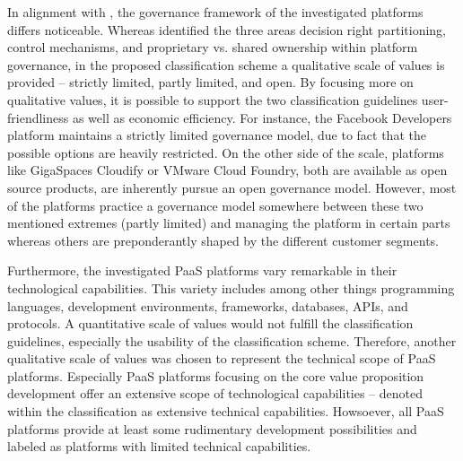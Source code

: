 In alignment with \citet{Tiwana2010}, the governance framework of the investigated platforms differs noticeable. Whereas \citet[pp. 679-681]{Tiwana2010} identified the three areas decision right partitioning, control mechanisms, and proprietary vs. shared ownership within platform governance, in the proposed classification scheme a qualitative scale of values is provided -- strictly limited, partly limited, and open. By focusing more on qualitative values, it is possible to support the two classification guidelines user-friendliness as well as economic efficiency. For instance, the Facebook Developers platform maintains a strictly limited governance model, due to fact that the possible options are heavily restricted. On the other side of the scale, platforms like GigaSpaces Cloudify or VMware Cloud Foundry, both are available as open source products, are inherently pursue an open governance model. However, most of the platforms practice a governance model somewhere between these two mentioned extremes (partly limited) and managing the platform in certain parts whereas others are preponderantly shaped by the different customer segments.

Furthermore, the investigated \ac{PaaS} platforms vary remarkable in their technological capabilities. This variety includes among other things programming languages, development environments, frameworks, databases, \acp{API}, and protocols. A quantitative scale of values would not fulfill the classification guidelines, especially the usability of the classification scheme. Therefore, another qualitative scale of values was chosen to represent the technical scope of \ac{PaaS} platforms. Especially \ac{PaaS} platforms focusing on the core value proposition development offer an extensive scope of technological capabilities -- denoted within the classification as extensive technical capabilities. Howsoever, all \ac{PaaS} platforms provide at least some rudimentary development possibilities and labeled as platforms with limited technical capabilities.


